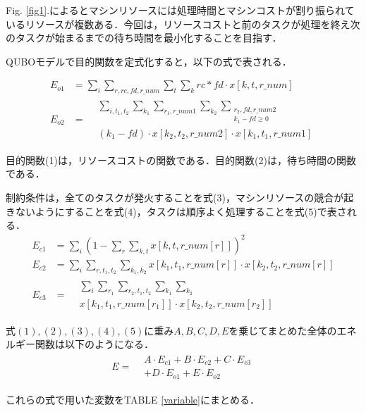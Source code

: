 \documentclass[conference]{IEEEtran}
\begin{document}
Fig. \ref{fig1}.によるとマシンリソースには処理時間とマシンコストが割り振られているリソースが複数ある．今回は，リソースコストと前のタスクが処理を終え次のタスクが始まるまでの待ち時間を最小化することを目指す．

QUBOモデルで目的関数を定式化すると，以下の式で表される．

\begin{align}
E_{o1} &=\sum_i \sum_{r,rc,fd,r\_num} \sum_t \sum_k rc * fd \cdot x[k,t,r\_num] \\
E_{o2} &= \begin{aligned}
&\sum_{i,t_1,t_2} \sum_{k_1} \sum_{r_1,r\_num1} \sum_{k_2} \sum_{\substack{r_2,fd,r\_num2 \\ k_1 - fd \geq 0}} \\
&(k_1 - fd) \cdot x[k_2,t_2,r\_num2] \cdot x[k_1,t_1,r\_num1]
\end{aligned}
\end{align}

目的関数(1)は，リソースコストの関数である．目的関数(2)は，待ち時間の関数である．

制約条件は，全てのタスクが発火することを式(3)，マシンリソースの競合が起きないようにすることを式(4)，タスクは順序よく処理することを式(5)で表される．
\begin{align}
E_{c1} &= \sum_i (1-\sum_r \sum_{k,t} x[k,t,r\_num[r]])^2 \\
E_{c2} &= \sum_i \sum_{r,t_1,t_2} \sum_{k_1,k_2} x[k_1,t_1,r\_num[r]] \cdot x[k_2,t_2,r\_num[r]]  \\
E_{c3} &= \begin{aligned}
&\sum_i \sum_{r_1} \sum_{r_2,t_1,t_2} \sum_{k_1} \sum_{k_2} \\
&x[k_1,t_1,r\_num[r_1]] \cdot x[k_2,t_2,r\_num[r_2]]
\end{aligned}
\end{align}

式$(1),(2),(3),(4),(5)$に重み$A,B,C,D,E$を乗じてまとめた全体のエネルギー関数は以下のようになる．
\begin{align}
E = \begin{aligned}
&A \cdot E_{c1} + B \cdot E_{c2} + C \cdot E_{c3} \\
&+ D \cdot E_{o1} + E \cdot E_{o2}
\end{aligned}
\end{align}

これらの式で用いた変数をTABLE \ref{variable}にまとめる．
\end{document}
